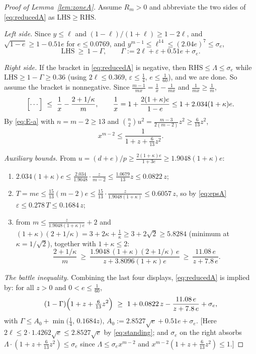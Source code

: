 \documentclass[11pt]{article}
\newcommand{\eps}{\varepsilon}
\begin{document}
\begin{proof}[Proof of Lemma~\ref{lem:zoneA}]
Assume $R_m>0$ and abbreviate the two sides of \eqref{eq:reducedA} as
$\mathrm{LHS}\ge\mathrm{RHS}$.

\emph{Left side.}  Since $y\le\ell$ and $(1-\ell)/(1+\ell)\ge1-2\ell$, and
$\sqrt{1-e}\ge1-0.51e$ for $e\le0.0769$, and
$y^{m-1}\le\ell^{14}\le(2.04e)^7\le\sigma_e$,
\begin{equation}\label{eq:GammaA}
        \mathrm{LHS}\ \ge\ 1-\Gamma,
        \qquad
        \Gamma:=2\ell+\eps+0.51e+\sigma_e .
\end{equation}

\emph{Right side.}  If the bracket in \eqref{eq:reducedA} is negative, then
$\mathrm{RHS}\le\Lambda\le\sigma_e$ while $\mathrm{LHS}\ge1-\Gamma\ge0.36$
(using $2\ell\le0.369$, $\eps\le\tfrac14$, $e\le\tfrac1{60}$), and we are
done.  So assume the bracket is nonnegative.  Since
$\frac{m-1}{mx}=\frac1x-\frac1{mx}$ and $\frac1{mx}\ge\frac1m$,
\[
        \Bigl[\cdots\Bigr]\ \le\ \frac1x-\frac{2+1/\kappa}{m},
        \qquad
        \frac1x=1+\frac{2(1+\kappa)e}{1-e}\le1+2.034(1+\kappa)e .
\]
By \eqref{eq:E-a} with $n=m-2\ge13$ and
$\binom n2u^2=\frac{m-3}{2(m-2)}z^2\ge\frac6{13}z^2$,
\[
        x^{m-2}\le\frac1{1+z+\frac6{13}z^2}.
\]

\emph{Auxiliary bounds.}  From $u=(d+e)/p\ge\frac{2(1+\kappa)e}{1+3e}
\ge1.9048(1+\kappa)e$:
\begin{enumerate}[label=\textup{(\alph*)},leftmargin=2.4em]
\item $2.034(1+\kappa)e\le\frac{2.034}{1.9048}\cdot\frac z{m-2}
\le\frac{1.0679}{13}z\le0.0822\,z$;
\item $T=me\le\frac{15}{13}(m-2)e\le\frac{15}{13}\cdot
\frac{z}{1.9048(1+\kappa)}\le0.6057\,z$, so by \eqref{eq:epsA}
$\eps\le0.278\,T\le0.1684\,z$;
\item from $m\le\frac{z}{1.9048(1+\kappa)e}+2$ and
$(1+\kappa)(2+1/\kappa)=3+2\kappa+\frac1\kappa\ge3+2\sqrt2\ge5.8284$
(minimum at $\kappa=1/\sqrt2$), together with $1+\kappa\le2$:
\[
        \frac{2+1/\kappa}{m}
        \ \ge\ \frac{1.9048\,(1+\kappa)(2+1/\kappa)\,e}{z+3.8096(1+\kappa)e}
        \ \ge\ \frac{11.08\,e}{z+7.8\,e}.
\]
\end{enumerate}

\emph{The battle inequality.}  Combining the last four displays,
\eqref{eq:reducedA} is implied by: for all $z>0$ and $0<e\le\tfrac1{60}$,
\begin{equation}\label{eq:battle}
        (1-\Gamma)\Bigl(1+z+\tfrac6{13}z^2\Bigr)
        \ \ge\ 1+0.0822\,z-\frac{11.08\,e}{z+7.8\,e}+\sigma_e ,
\end{equation}
with $\Gamma\le A_0+\min\bigl(\tfrac14,\,0.1684z\bigr)$,
$A_0:=2.8527\sqrt e+0.51e+\sigma_e$.
[Here $2\ell\le2\cdot1.4262\sqrt e\le2.8527\sqrt e$ by \eqref{eq:standing};
and $\sigma_e$ on the right absorbs $\Lambda\cdot(1+z+\tfrac6{13}z^2)
\le\sigma_e$ since $\Lambda\le\sigma_ex^{m-2}$ and
$x^{m-2}(1+z+\tfrac6{13}z^2)\le1$.]


\end{proof}
\end{document}
